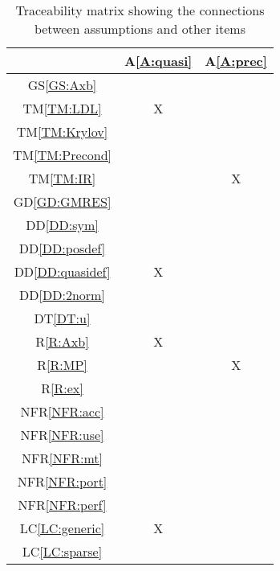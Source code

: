 \documentclass[12pt]{article}
\newcommand{\dref}[1]{GD\ref{#1}}
\newcommand{\ddref}[1]{DD\ref{#1}}
\newcommand{\dtref}[1]{DT\ref{#1}}
\newcommand{\tref}[1]{TM\ref{#1}}
\newcommand{\aref}[1]{A\ref{#1}}
\newcommand{\gsref}[1]{GS\ref{#1}}
\newcommand{\rref}[1]{R\ref{#1}}
\newcommand{\nfrref}[1]{NFR\ref{#1}}
\newcommand{\lcref}[1]{LC\ref{#1}}
\begin{document}
\begin{table}[H]
  \centering
  \begin{tabular}{|c|c|c|}                                      \hline
                        & \aref{A:quasi} & \aref{A:prec} \\ \hline
    \gsref{GS:Axb}      &                &               \\ \hline
    \tref{TM:LDL}       & X              &               \\ \hline
    \tref{TM:Krylov}    &                &               \\ \hline
    \tref{TM:Precond}   &                &               \\ \hline
    \tref{TM:IR}        &                & X             \\ \hline
    \dref{GD:GMRES}     &                &               \\ \hline
    \ddref{DD:sym}      &                &               \\ \hline
    \ddref{DD:posdef}   &                &               \\ \hline
    \ddref{DD:quasidef} & X              &               \\ \hline
    \ddref{DD:2norm}    &                &               \\ \hline
    \dtref{DT:u}        &                &               \\ \hline
    \rref{R:Axb}        & X              &               \\ \hline
    \rref{R:MP}         &                & X             \\ \hline
    \rref{R:ex}         &                &               \\ \hline
    \nfrref{NFR:acc}    &                &               \\ \hline
    \nfrref{NFR:use}    &                &               \\ \hline
    \nfrref{NFR:mt}     &                &               \\ \hline
    \nfrref{NFR:port}   &                &               \\ \hline
    \nfrref{NFR:perf}   &                &               \\ \hline
    \lcref{LC:generic}  & X              &               \\ \hline
    \lcref{LC:sparse}   &                &               \\ \hline
  \end{tabular}
  \caption{Traceability matrix showing the connections between assumptions and other items}
  \label{Table:A_trace}
\end{table}
\end{document}
